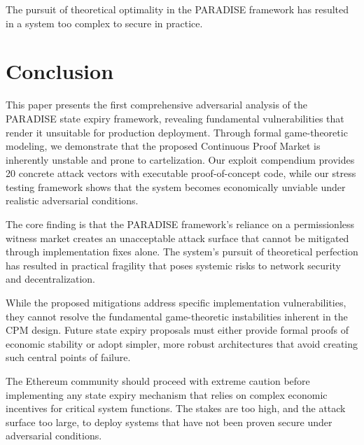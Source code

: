 \documentclass{article}
\begin{document}
The pursuit of theoretical optimality in the PARADISE framework has resulted in a system too complex to secure in practice.

\section{Conclusion}

This paper presents the first comprehensive adversarial analysis of the PARADISE state expiry framework, revealing fundamental vulnerabilities that render it unsuitable for production deployment. Through formal game-theoretic modeling, we demonstrate that the proposed Continuous Proof Market is inherently unstable and prone to cartelization. Our exploit compendium provides 20 concrete attack vectors with executable proof-of-concept code, while our stress testing framework shows that the system becomes economically unviable under realistic adversarial conditions.

The core finding is that the PARADISE framework's reliance on a permissionless witness market creates an unacceptable attack surface that cannot be mitigated through implementation fixes alone. The system's pursuit of theoretical perfection has resulted in practical fragility that poses systemic risks to network security and decentralization.

While the proposed mitigations address specific implementation vulnerabilities, they cannot resolve the fundamental game-theoretic instabilities inherent in the CPM design. Future state expiry proposals must either provide formal proofs of economic stability or adopt simpler, more robust architectures that avoid creating such central points of failure.

The Ethereum community should proceed with extreme caution before implementing any state expiry mechanism that relies on complex economic incentives for critical system functions. The stakes are too high, and the attack surface too large, to deploy systems that have not been proven secure under adversarial conditions.




\end{document}
